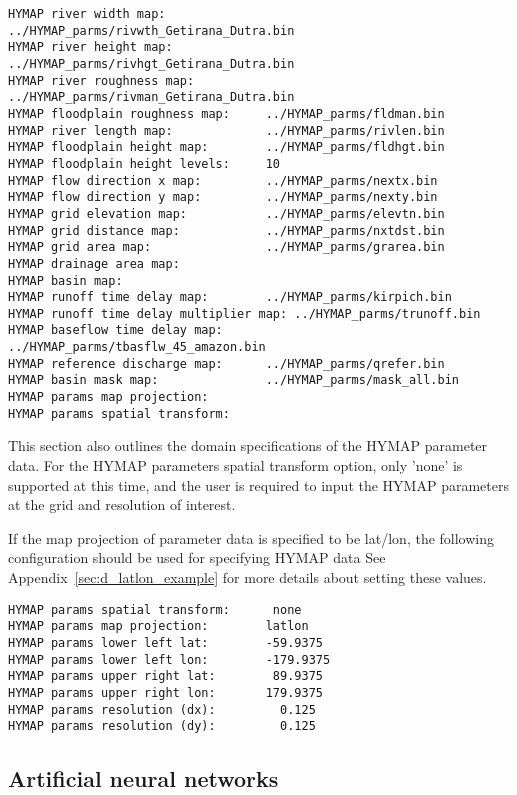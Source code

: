  

 \begin{Verbatim}[frame=single]
HYMAP river width map:              ../HYMAP_parms/rivwth_Getirana_Dutra.bin
HYMAP river height map:             ../HYMAP_parms/rivhgt_Getirana_Dutra.bin 
HYMAP river roughness map:          ../HYMAP_parms/rivman_Getirana_Dutra.bin 
HYMAP floodplain roughness map:     ../HYMAP_parms/fldman.bin
HYMAP river length map:             ../HYMAP_parms/rivlen.bin
HYMAP floodplain height map:        ../HYMAP_parms/fldhgt.bin
HYMAP floodplain height levels:     10
HYMAP flow direction x map:         ../HYMAP_parms/nextx.bin
HYMAP flow direction y map:         ../HYMAP_parms/nexty.bin
HYMAP grid elevation map:           ../HYMAP_parms/elevtn.bin
HYMAP grid distance map:            ../HYMAP_parms/nxtdst.bin
HYMAP grid area map:                ../HYMAP_parms/grarea.bin
HYMAP drainage area map:
HYMAP basin map:
HYMAP runoff time delay map:        ../HYMAP_parms/kirpich.bin
HYMAP runoff time delay multiplier map: ../HYMAP_parms/trunoff.bin
HYMAP baseflow time delay map:      ../HYMAP_parms/tbasflw_45_amazon.bin
HYMAP reference discharge map:      ../HYMAP_parms/qrefer.bin
HYMAP basin mask map:               ../HYMAP_parms/mask_all.bin 
HYMAP params map projection:
HYMAP params spatial transform:
 \end{Verbatim}

 
 This section also outlines the domain specifications of the
 HYMAP parameter data.
 For the HYMAP parameters spatial transform option, only 'none' is
 supported at this time, and the user is required to input the HYMAP
 parameters at the grid and resolution of interest.

 If the map projection of parameter data is specified to be lat/lon,
 the following configuration should be used for specifying HYMAP data
 See Appendix~\ref{sec:d_latlon_example} for more details about
 setting these values.
 

 \begin{Verbatim}[frame=single]
HYMAP params spatial transform:      none
HYMAP params map projection:        latlon
HYMAP params lower left lat:        -59.9375
HYMAP params lower left lon:        -179.9375
HYMAP params upper right lat:        89.9375
HYMAP params upper right lon:       179.9375
HYMAP params resolution (dx):         0.125
HYMAP params resolution (dy):         0.125
 \end{Verbatim}


 
 \subsection{Artificial neural networks} \label{ssec:ann}

